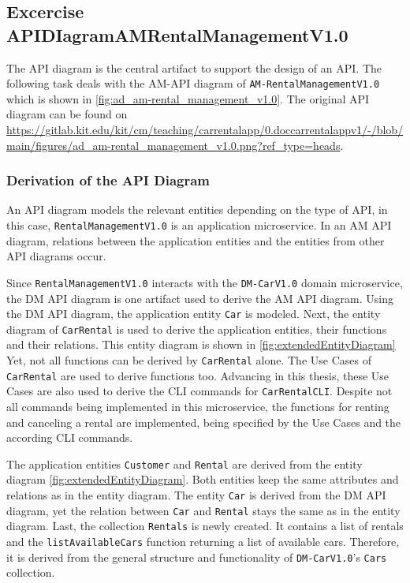 \subsection{Excercise APIDIagramAMRentalManagementV1.0}
The API diagram is the central artifact to support the design of an API.
The following task deals with the AM-API diagram of \texttt{AM-RentalManagementV1.0} which is shown in \autoref{fig:ad_am-rental_management_v1.0}.
The original API diagram can be found on \url{https://gitlab.kit.edu/kit/cm/teaching/carrentalapp/0.doccarrentalappv1/-/blob/main/figures/ad_am-rental_management_v1.0.png?ref_type=heads}.

\subsubsection*{Derivation of the API Diagram}
An API diagram models the relevant entities depending on the type of API, in this case, \hfill \linebreak \texttt{RentalManagementV1.0} is an application microservice.
In an AM API diagram, relations between the application entities and the entities from other API diagrams occur.

Since \texttt{RentalManagementV1.0} interacts with the \texttt{DM-CarV1.0} domain microservice, the DM API diagram is one artifact used to derive the AM API diagram.
Using the DM API diagram, the application entity \texttt{Car} is modeled.
Next, the entity diagram of \texttt{CarRental} is used to derive the application entities, their functions and their relations.
This entity diagram is shown in \autoref{fig:extendedEntityDiagram}
Yet, not all functions can be derived by \texttt{CarRental} alone.
The Use Cases of \texttt{CarRental} are used to derive functions too.
Advancing in this thesis, these Use Cases are also used to derive the CLI commands for \texttt{CarRentalCLI}.
Despite not all commands being implemented in this microservice, the functions for renting and canceling a rental are implemented, being specified by the Use Cases and the according CLI commands.

The application entities \texttt{Customer} and \texttt{Rental} are derived from the entity diagram \autoref{fig:extendedEntityDiagram}.
Both entities keep the same attributes and relations as in the entity diagram.
The entity \texttt{Car} is derived from the DM API diagram, yet the relation between \texttt{Car} and \texttt{Rental} stays the same as in the entity diagram.
Last, the collection \texttt{Rentals} is newly created.
It contains a list of rentals and the \texttt{listAvailableCars} function returning a list of available cars.
Therefore, it is derived from the general structure and functionality of \texttt{DM-CarV1.0}'s \texttt{Cars} collection.

